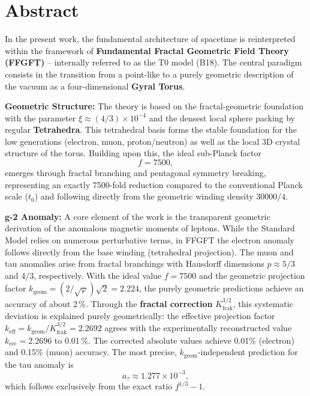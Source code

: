 \section*{Abstract}
		In the present work, the fundamental architecture of spacetime is reinterpreted within the framework of \textbf{Fundamental Fractal Geometric Field Theory (FFGFT)} – internally referred to as the T0 model (B18). The central paradigm consists in the transition from a point-like to a purely geometric description of the vacuum as a four-dimensional \textbf{Gyral Torus}.
		
		\textbf{Geometric Structure:} The theory is based on the fractal-geometric foundation with the parameter $\xi \approx (4/3)\times 10^{-4}$ and the densest local sphere packing by regular \textbf{Tetrahedra}. This tetrahedral basis forms the stable foundation for the low generations (electron, muon, proton/neutron) as well as the local 3D crystal structure of the torus. Building upon this, the ideal sub-Planck factor
		\begin{equation*}
			f = 7500,
		\end{equation*}
		emerges through fractal branching and pentagonal symmetry breaking, representing an exactly 7500-fold reduction compared to the conventional Planck scale ($t_0$) and following directly from the geometric winding density $30000/4$.
		
		\textbf{g-2 Anomaly:} A core element of the work is the transparent geometric derivation of the anomalous magnetic moments of leptons. While the Standard Model relies on numerous perturbative terms, in FFGFT the electron anomaly follows directly from the base winding (tetrahedral projection). The muon and tau anomalies arise from fractal branchings with Hausdorff dimensions $p \approx 5/3$ and $4/3$, respectively. With the ideal value $f = 7500$ and the geometric projection factor $k_\text{geom} = (2/\sqrt{\varphi})\sqrt{2} = 2.224$, the purely geometric predictions achieve an accuracy of about 2\,\%. Through the \textbf{fractal correction} $K_\text{frak}^{3/2}$, this systematic deviation is explained purely geometrically: the effective projection factor $k_\text{eff} = k_\text{geom}/K_\text{frak}^{3/2} = 2.2692$ agrees with the experimentally reconstructed value $k_\text{rec} = 2.2696$ to 0.01\,\%. The corrected absolute values achieve 0.01\% (electron) and 0.15\% (muon) accuracy. The most precise, $k_\text{geom}$-independent prediction for the tau anomaly is
		\begin{equation*}
			a_\tau \approx 1.277 \times 10^{-3},
		\end{equation*}
		which follows exclusively from the exact ratio $f^{1/3} - 1$.
		
